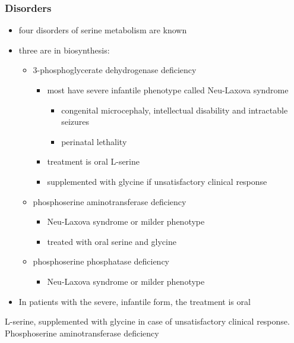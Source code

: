 \documentclass{scrartcl}
\begin{document}
\subsubsection{Disorders}
\label{sec:orgb5907c8}
\begin{itemize}
\item four disorders of serine metabolism are known

\item three are in biosynthesis:
\begin{itemize}
\item 3-phosphoglycerate dehydrogenase deficiency
\begin{itemize}
\item most have severe infantile phenotype called Neu-Laxova syndrome
\begin{itemize}
\item congenital microcephaly, intellectual disability and
intractable seizures
\item perinatal lethality
\end{itemize}
\item treatment is oral L-serine
\item supplemented with glycine if unsatisfactory clinical response
\end{itemize}
\item phosphoserine aminotransferase deficiency
\begin{itemize}
\item Neu-Laxova syndrome or milder phenotype
\item treated with oral serine and glycine
\end{itemize}
\item phosphoserine phosphatase deficiency
\begin{itemize}
\item Neu-Laxova syndrome or milder phenotype
\end{itemize}
\end{itemize}

\item In patients with the severe, infantile form, the treatment is oral
\end{itemize}
L-serine, supplemented with glycine in case of unsatisfactory
clinical response. Phosphoserine aminotransferase deficiency
\end{document}

